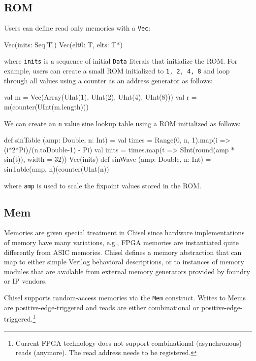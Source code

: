 \documentclass[twocolumn,10pt]{article}
\def\code#1{{\tt #1}}
\begin{document}
\subsection{ROM}

Users can define read only memories with a \code{Vec}:

\begin{scala}
Vec(inits: Seq[T])
Vec(elt0: T, elts: T*)
\end{scala}

\noindent
where \verb+inits+ is a sequence of initial \verb+Data+ literals that
initialize the ROM.
For example,  users can
create a small ROM initialized to \verb+1, 2, 4, 8+ and 
loop through all values using a counter as an address generator as follows:

\begin{scala}
val m = Vec(Array(UInt(1), UInt(2), UInt(4), UInt(8)))
val r = m(counter(UInt(m.length)))
\end{scala}

\noindent
We can create an \verb+n+ value sine lookup table using a ROM initialized as follows:

\begin{scala}
def sinTable (amp: Double, n: Int) = {
  val times = 
    Range(0, n, 1).map(i => (i*2*Pi)/(n.toDouble-1) - Pi)
  val inits = 
    times.map(t => SInt(round(amp * sin(t)), width = 32))
  Vec(inits)
}
def sinWave (amp: Double, n: Int) = 
  sinTable(amp, n)(counter(UInt(n))
\end{scala}

\noindent
where \verb+amp+ is used to scale the fixpoint values stored in the ROM.

\subsection{Mem}

Memories are given special treatment in Chisel since hardware
implementations of memory have many variations, e.g., FPGA memories
are instantiated quite differently from ASIC memories.  Chisel defines
a memory abstraction that can map to either simple Verilog behavioral
descriptions, or to instances of memory modules that are available
from external memory generators provided by foundry or IP vendors.  

Chisel supports random-access memories via the \code{Mem} construct.
Writes to Mems are positive-edge-triggered and reads are either
combinational or positive-edge-triggered.\footnote{Current FPGA technology
does not support combinational (asynchronous) reads (anymore). The read address
needs to be registered.}
\end{document}
